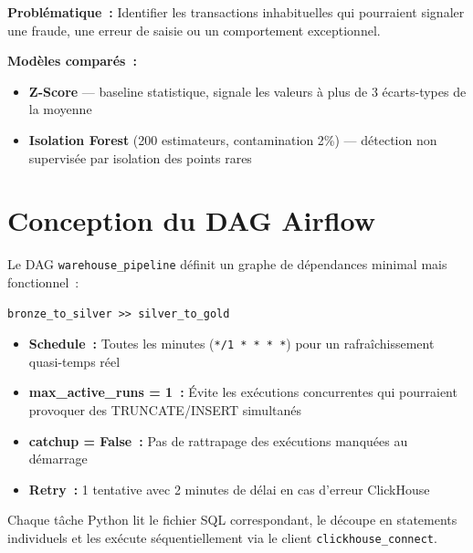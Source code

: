 \textbf{Problématique~:} Identifier les transactions inhabituelles qui pourraient signaler une fraude, une erreur de saisie ou un comportement exceptionnel.

\textbf{Modèles comparés~:}
\begin{itemize}
  \setlength{\itemsep}{0.3em}
  \item \textbf{Z-Score} — baseline statistique, signale les valeurs à plus de 3 écarts-types de la moyenne
  \item \textbf{Isolation Forest} (200 estimateurs, contamination 2\%) — détection non supervisée par isolation des points rares
\end{itemize}

\section{Conception du DAG Airflow}

Le DAG \texttt{warehouse\_pipeline} définit un graphe de dépendances minimal mais fonctionnel~:

\begin{verbatim}
bronze_to_silver >> silver_to_gold
\end{verbatim}

\begin{itemize}
  \setlength{\itemsep}{0.4em}
  \item \textbf{Schedule~:} Toutes les minutes (\texttt{*/1 * * * *}) pour un rafraîchissement quasi-temps réel
  \item \textbf{max\_active\_runs = 1~:} Évite les exécutions concurrentes qui pourraient provoquer des TRUNCATE/INSERT simultanés
  \item \textbf{catchup = False~:} Pas de rattrapage des exécutions manquées au démarrage
  \item \textbf{Retry~:} 1 tentative avec 2 minutes de délai en cas d'erreur ClickHouse
\end{itemize}

Chaque tâche Python lit le fichier SQL correspondant, le découpe en statements individuels et les exécute séquentiellement via le client \texttt{clickhouse\_connect}.

